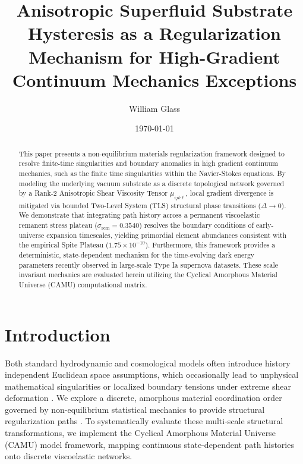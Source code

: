 \documentclass[reprint,amsmath,amssymb,aps,prd,nofootinbib]{revtex4-2}
\begin{document}

\title{Anisotropic Superfluid Substrate Hysteresis as a Regularization Mechanism for High-Gradient Continuum Mechanics Exceptions}

\author{William Glass}

\date{\today}

\begin{abstract}
This paper presents a non-equilibrium materials regularization framework designed to resolve finite-time singularities and boundary anomalies in high gradient continuum mechanics, such as the finite time singularities within the Navier-Stokes equations. By modeling the underlying vacuum substrate as a discrete topological network governed by a Rank-2 Anisotropic Shear Viscosity Tensor $\mu_{ijk\ell}$, local gradient divergence is mitigated via bounded Two-Level System (TLS) structural phase transitions ($\Delta \to 0$). We demonstrate that integrating path history across a permanent viscoelastic remanent stress plateau ($\sigma_{\text{rem}} = 0.3540$) resolves the boundary conditions of early-universe expansion timescales, yielding primordial element abundances consistent with the empirical Spite Plateau ($1.75 \times 10^{-10}$). Furthermore, this framework provides a deterministic, state-dependent mechanism for the time-evolving dark energy parameters recently observed in large-scale Type Ia supernova datasets. These scale invariant mechanics are evaluated herein utilizing the Cyclical Amorphous Material Universe (CAMU) computational matrix.
\end{abstract}

\maketitle

\section{Introduction}
Both standard hydrodynamic and cosmological models often introduce history independent Euclidean space assumptions, which occasionally lead to unphysical mathematical singularities or localized boundary tensions under extreme shear deformation \cite{anderson1972}. We explore a discrete, amorphous material coordination order governed by non-equilibrium statistical mechanics to provide structural regularization paths \cite{jaynes1957, martyushev2006}. To systematically evaluate these multi-scale structural transformations, we implement the Cyclical Amorphous Material Universe (CAMU) model framework, mapping continuous state-dependent path histories onto discrete viscoelastic networks.
\end{document}

